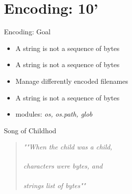 \section{Encoding: 10'}



\begin{frame}[fragile]{Encoding: Goal}
\begin{itemize}
\item A string is not a sequence of bytes
\item A string is not a sequence of bytes
\item Manage differently encoded filenames 
\item A string is not a sequence of bytes
\item modules: \emph{os, os.path, glob}
\end{itemize}
\end{frame}


\begin{frame}{Song of Childhod}
\begin{verse}
\begin{center}
\emph{""When the child was a child,\\
\\
characters were bytes, and\\
\\
strings list of bytes""}

\end{center}
\end{verse}
\end{frame}

